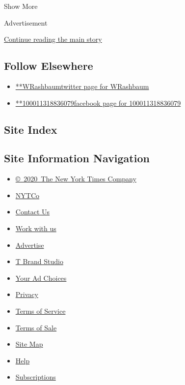 Show More

Advertisement

\protect\hyperlink{after-mid2}{Continue reading the main story}

\hypertarget{follow-elsewhere}{%
\subsection{Follow Elsewhere}\label{follow-elsewhere}}

\begin{itemize}
\tightlist
\item
  \href{https://twitter.com/WRashbaum}{**WRashbaumtwitter page for
  WRashbaum}
\item
  \href{https://www.facebook.com/100011318836079}{**100011318836079facebook
  page for 100011318836079}
\end{itemize}

\hypertarget{site-index}{%
\subsection{Site Index}\label{site-index}}

\hypertarget{site-information-navigation}{%
\subsection{Site Information
Navigation}\label{site-information-navigation}}

\begin{itemize}
\tightlist
\item
  \href{https://help.nytimes.com/hc/en-us/articles/115014792127-Copyright-notice}{©~2020~The
  New York Times Company}
\end{itemize}

\begin{itemize}
\tightlist
\item
  \href{https://www.nytco.com/}{NYTCo}
\item
  \href{https://help.nytimes.com/hc/en-us/articles/115015385887-Contact-Us}{Contact
  Us}
\item
  \href{https://www.nytco.com/careers/}{Work with us}
\item
  \href{https://nytmediakit.com/}{Advertise}
\item
  \href{http://www.tbrandstudio.com/}{T Brand Studio}
\item
  \href{https://www.nytimes.com/privacy/cookie-policy\#how-do-i-manage-trackers}{Your
  Ad Choices}
\item
  \href{https://www.nytimes.com/privacy}{Privacy}
\item
  \href{https://help.nytimes.com/hc/en-us/articles/115014893428-Terms-of-service}{Terms
  of Service}
\item
  \href{https://help.nytimes.com/hc/en-us/articles/115014893968-Terms-of-sale}{Terms
  of Sale}
\item
  \href{https://spiderbites.nytimes.com}{Site Map}
\item
  \href{https://help.nytimes.com/hc/en-us}{Help}
\item
  \href{https://www.nytimes.com/subscription?campaignId=37WXW}{Subscriptions}
\end{itemize}
